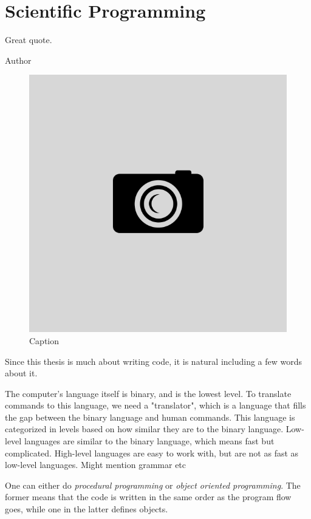 \chapter{Scientific Programming} \label{chp:scientificprogramming}
\epigraph{Great quote.}{Author}
\begin{figure}[H]
	\centering
	\includegraphics[scale=0.4]{Images/example.png}
	\caption{Caption}
\end{figure}

Since this thesis is much about writing code, it is natural including a few words about it. 

The computer's language itself is binary, and is the lowest level. To translate commands to this language, we need a "translator", which is a language that fills the gap between the binary language and human commands. This language is categorized in levels based on how similar they are to the binary language. Low-level languages are similar to the binary language, which means fast but complicated. High-level languages are easy to work with, but are not as fast as low-level languages. Might mention grammar etc

One can either do \textit{procedural programming} or \textit{object oriented programming}. The former means that the code is written in the same order as the program flow goes, while one in the latter defines objects. 

